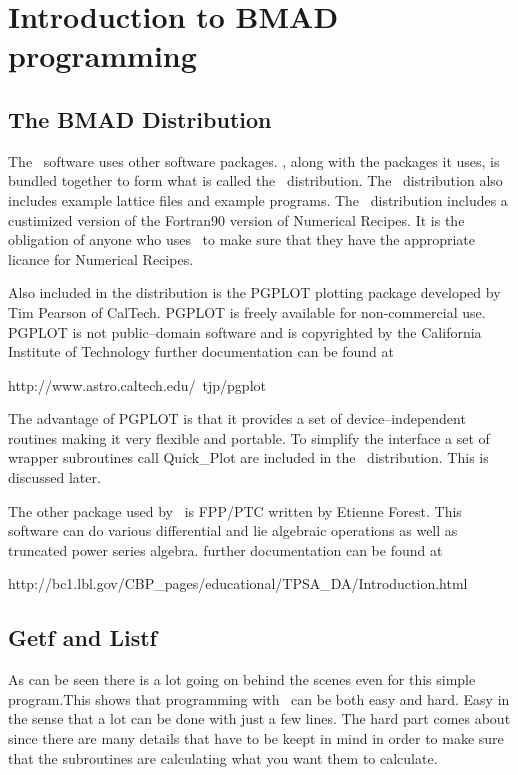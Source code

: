 \chapter{Introduction to BMAD programming}

\section{The BMAD Distribution}

The \bmad\ software uses other software packages. \bmad, along with the packages it uses, 
is bundled together to form what is called the \bmad\ distribution. The \bmad\ distribution
also includes example lattice files and example programs. The \bmad\ distribution includes a custimized version of the Fortran90 version of Numerical Recipes\cite{nr}. It is the obligation of anyone who uses \bmad\ to make sure that they have the appropriate licance for Numerical Recipes. 

Also included in the distribution is the PGPLOT plotting package developed by Tim Pearson of CalTech.
PGPLOT is freely available for non-commercial use. PGPLOT is not public--domain software and is copyrighted by the California Institute of Technology further documentation can be found at
\begin{example}
    http://www.astro.caltech.edu/~tjp/pgplot
\end{example}
The advantage of PGPLOT is that it provides a set of device--independent routines making it very flexible and portable. To simplify the interface a set of wrapper subroutines call Quick_Plot are
included in the \bmad\ distribution. This is discussed later.

The other package used by \bmad\ is FPP/PTC written by Etienne Forest. This software can do 
various differential and lie algebraic operations as well as truncated power series algebra. further
documentation can be found at
\begin{example}
    http://bc1.lbl.gov/CBP_pages/educational/TPSA_DA/Introduction.html
\end{example}

\section{Getf and Listf}

As can be seen there is a lot going on behind the scenes even for this
simple program.This shows that programming with \bmad\ can be both easy
and hard. Easy in the sense that a lot can be done with just a few
lines. The hard part comes about since there are many details that
have to be keept in mind in order to make sure that the subroutines
are calculating what you want them to calculate.


